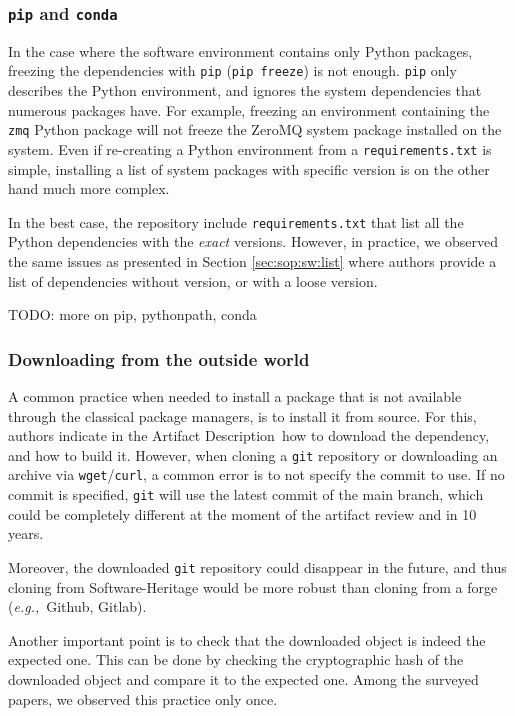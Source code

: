 \documentclass[sigconf,natbib=false]{acmart}
\newcommand{\eg}{\emph{e.g.,}}
\newcommand{\ad}{Artifact Description}
\newcommand{\todo}[1]{{\color{red}TODO: #1}}
\begin{document}
\subsubsection{\texttt{pip} and \texttt{conda}}

In the case where the software environment contains only Python packages, freezing the dependencies with \texttt{pip} (\texttt{pip freeze}) is not enough.
\texttt{pip} only describes the Python environment, and ignores the system dependencies that numerous packages have. 
For example, freezing an environment containing the \texttt{zmq} Python package will not freeze the ZeroMQ system package installed on the system.  
Even if re-creating a Python environment from a \texttt{requirements.txt} is simple, installing a list of system packages with specific version is on the other hand much more complex.

In the best case, the repository include \texttt{requirements.txt} that list all the Python dependencies with the \emph{exact} versions.
However, in practice, we observed the same issues as presented in Section \ref{sec:sop:sw:list} where authors provide a list of dependencies without version, or with a loose version.

\todo{more on pip, pythonpath, conda}

\subsubsection{Downloading from the outside world}

A common practice when needed to install a package that is not available through the classical package managers, is to install it from source.
For this, authors indicate in the \ad\ how to download the dependency, and how to build it.
However, when cloning a \texttt{git} repository or downloading an archive via \texttt{wget}/\texttt{curl}, a common error is to not specify the commit to use.
If no commit is specified, \texttt{git} will use the latest commit of the main branch, which could be completely different at the moment of the artifact review and in 10 years.

Moreover, the downloaded \texttt{git} repository could disappear in the future, and thus cloning from Software-Heritage would be more robust than cloning from a forge (\eg\ Github, Gitlab).

Another important point is to check that the downloaded object is indeed the expected one.
This can be done by checking the cryptographic hash of the downloaded object and compare it to the expected one.
Among the surveyed papers, we observed this practice only once.
\end{document}
